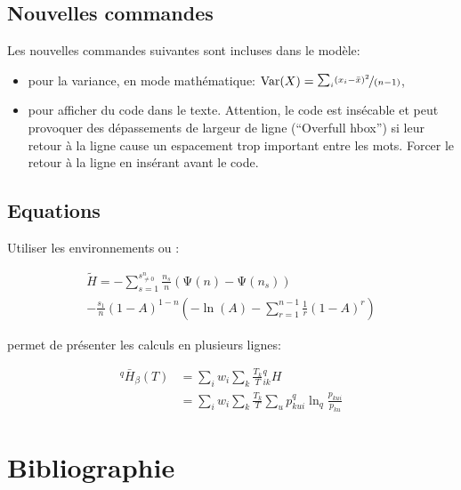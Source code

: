 \documentclass[
  a4paper, %
  11pt, extrafontsizes, %
  onecolumn, %
  openright, %
]{memoir}
\begin{document}
\subsection{Nouvelles commandes}

Les nouvelles commandes suivantes sont incluses dans le modèle:
\begin{itemize}
  \item {} pour la variance, en mode mathématique: $\mathop{\mathrm{Var}}(X)=\nicefrac{\sum_i(x_i-\bar{x})^2}{(n-1)}$,
  \item {} pour afficher du code dans le texte. Attention, le code est insécable et peut provoquer des dépassements de largeur de ligne (\foreignlanguage{english}{``Overfull hbox''}) si leur retour à la ligne cause un espacement trop important entre les mots. Forcer le retour à la ligne en insérant  avant le code.
\end{itemize}

\subsection{Equations}

Utiliser les environnements  ou :

\begin{multline}
  \tilde{H}
  = -\sum_{s=1}^{s^{n}_{\ne 0}}
    {\frac{n_s}{n}\left(\mathrm{\Psi}\left(n\right) - \mathrm{\Psi}\left(n_s\right)\right)} \\
    -\frac{s_{1}}{n} {\left(1-A\right)}^{1-n} \left(-{\ln\left(A\right)}-\sum^{n-1}_{r=1}{\frac{1}{r}{\left(1-A\right)}^r}\right)
\label{eq:Chao2013}
\end{multline}

  permet de présenter les calculs en plusieurs lignes:

\begin{align}
  ^{q}\bar{H}_{\beta}\left(T\right)
    &= \sum_i{w_i}\sum_k{\frac{T_k}{T}{^{q}_{ik}H}}\\
    &= \sum_i{w_i}\sum_k{\frac{T_k}{T}\sum_u{p^{q}_{kui}\ln_q\frac{p_{kui}}{p_{ku}}}}
\end{align}



\section{Bibliographie}
\end{document}
